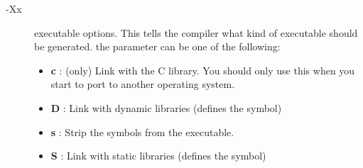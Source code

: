 \documentclass{report}
\newcommand{\olabel}[1]{\label{option:#1}}
\begin{document}
\begin{description}
\item [-Xx] \olabel{X} executable options. This tells the compiler what
kind of executable should be generated. the parameter 
can be one of the following:
\begin{itemize}
\item \textbf{c} : (\linux only) Link with the C library. You should only use this when
  you start to port \fpc to another operating system.
\item \textbf{D} : Link with dynamic libraries (defines the 
 symbol)
\item \textbf{s} : Strip the symbols from the executable.
\item \textbf{S} : Link with static libraries (defines the 
 symbol)
\end{itemize}
\end{description}

%
%

\end{document}
